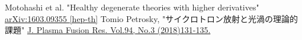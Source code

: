 \documentclass[dvipdfmx, uplatex]{jsarticle}
\begin{document}
\newpage

\newpage

\newpage

\newpage


\begin{thebibliography}{99}
  Motohashi et al.
  "Healthy degenerate theories with higher derivatives"
  \href{https://arxiv.org/abs/1603.09355}{	arXiv:1603.09355 [hep-th]}
  Tomio Petrosky,
  "サイクロトロン放射と光渦の理論的課題"
  \href{http://www.jspf.or.jp/Journal/PDF_JSPF/jspf2018_03/jspf2018_03-131.pdf}
  {J. Plasma Fusion Res. Vol.94, No.3 (2018)131-135.}
\end{thebibliography}
\end{document}
